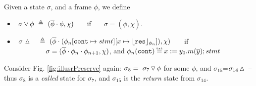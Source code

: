  
 
\begin{definition}
\label{def:push:frame}
Given a state $\sigma$, and a frame $\phi$,  we define
\begin{itemize}
\item
 $  \ {\sigma} \, {\triangledown}\, {\phi}  \ \triangleq \ ({\overline{\phi}\cdot\phi}, \chi)$ \ \ \  if \ \ \  $\sigma=(\overline{\phi}, \chi)$.
\item
$ \ \sigma\, \popSymbol \ \ \  \triangleq\   { (\overline{\phi}\cdot (\phi_n[\prg{cont}\mapsto stmt][x \mapsto \interpret {\phi_n}{\prg{res}}]), \chi)}$ \ \ \  if \\
 $\strut \hspace{1.5cm} \sigma=(\overline{\phi}\cdot\phi_n\cdot\phi_{n+1}, \chi)$, and $\phi_n(\prg{cont})\txteq x:= y_0.m(\overline y); stmt $
\end{itemize}
 \end{definition}

Consider Fig. \ref{fig:illusrPreserve}  again: $\sigma_8 =  \ {\sigma_7} \, {\triangledown}\, {\phi} $ for some $\phi$, and  $\sigma_{15}$=$\sigma_{14} \, {\vartriangle}\,$
--  thus $\sigma_8$ is a {\emph{called}} state for 
 $\sigma_7$, and  $\sigma_{15}$ is the {\emph{return}} state from 
 $\sigma_{14}$.

